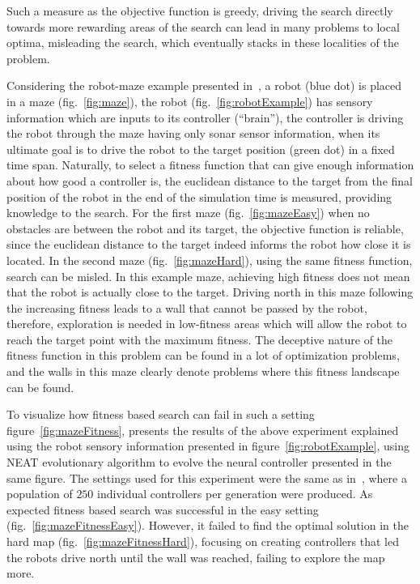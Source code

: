 Such a measure as the objective function is greedy, driving the search directly towards more rewarding areas of the search can lead  in many problems to local optima, misleading the search, which eventually stacks in these localities of the problem. 

Considering the robot-maze example presented in~\cite{lehman2011abandoning,lehman2010revising}, a robot (blue dot) is placed in a maze (fig.~\ref{fig:maze}), the robot (fig.~\ref{fig:robotExample}) has sensory information which are inputs to its controller (``brain''), the controller is driving the robot through the maze having only sonar sensor information, when its ultimate goal is to drive the robot to the target position (green dot) in a fixed time span. Naturally, to select a fitness function that can give enough information about how good a controller is, the euclidean distance to the target from the final position of the robot in the end of the simulation time is measured, providing knowledge to the search. For the first maze (fig.~\ref{fig:mazeEasy}) when no obstacles are between the robot and its target, the objective function is reliable, since the euclidean distance to the target indeed informs the robot how close it is located. In the second maze (fig.~\ref{fig:mazeHard}), using the same fitness function, search can be misled. In this example maze, achieving high fitness does not mean that the robot is actually close to the target. Driving north in this maze following the increasing fitness leads to a wall that cannot be passed by the robot, therefore, exploration is needed in low-fitness areas which will allow the robot to reach the target point with the maximum fitness. The deceptive nature of the fitness function in this problem can be found in a lot of optimization problems, and the walls in this maze clearly denote problems where this fitness landscape can be found. 

To visualize how fitness based search can fail in such a setting figure~\ref{fig:mazeFitness}, presents the results of the above experiment explained using the robot sensory information presented in figure~\ref{fig:robotExample}, using NEAT evolutionary algorithm to evolve the neural controller presented in the same figure. The settings used for this experiment were the same as in~\cite{lehman2011abandoning}, where a population of $250$ individual controllers per generation were produced. As expected fitness based search was successful in the easy setting (fig.~\ref{fig:mazeFitnessEasy}). However, it failed to find the optimal solution in the hard map (fig.~\ref{fig:mazeFitnessHard}), focusing on creating controllers that led the robots drive north until the wall was reached, failing to explore the map more.

